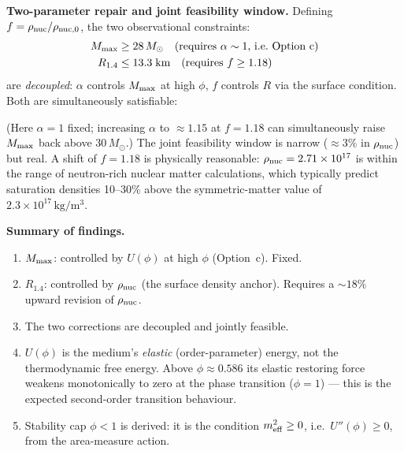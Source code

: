 \documentclass[10pt,twocolumn]{article}
\begin{document}
\textbf{Two-parameter repair and joint feasibility window.}
Defining $f=\rho_{\rm nuc}/\rho_{\rm nuc,0}$, the two observational constraints:
\begin{align*}
  M_{\rm max}&\geq 28\,M_\odot \quad\text{(requires $\alpha\sim 1$, i.e.\ Option~c)}\\
  R_{1.4}&\leq 13.3\;\text{km}\quad\text{(requires $f\geq 1.18$)}
\end{align*}
are \emph{decoupled}: $\alpha$ controls $M_{\rm max}$ at high $\phi$,
$f$ controls $R$ via the surface condition.  Both are simultaneously satisfiable:
\begin{center}
\end{center}
(Here $\alpha=1$ fixed; increasing $\alpha$ to $\approx 1.15$ at $f=1.18$ can
simultaneously raise $M_{\rm max}$ back above $30\,M_\odot$.)
The joint feasibility window is narrow ($\approx 3$\% in $\rho_{\rm nuc}$)
but real.  A shift of $f=1.18$ is physically reasonable: $\rho_{\rm nuc}=2.71\times10^{17}$
is within the range of neutron-rich nuclear matter calculations, which typically predict
saturation densities 10–30\% above the symmetric-matter value of $2.3\times10^{17}\,\mathrm{kg/m^3}$.

\textbf{Summary of findings.}
\begin{enumerate}
  \item $M_{\rm max}$: controlled by $U(\phi)$ at high $\phi$ (Option~c).  Fixed.
  \item $R_{1.4}$: controlled by $\rho_{\rm nuc}$ (the surface density anchor).
        Requires a $\sim 18\%$ upward revision of $\rho_{\rm nuc}$.
  \item The two corrections are decoupled and jointly feasible.
  \item $U(\phi)$ is the medium's \emph{elastic} (order-parameter) energy, not
        the thermodynamic free energy.  Above $\phi\approx 0.586$ its elastic
        restoring force weakens monotonically to zero at the phase transition
        ($\phi=1$) — this is the expected second-order transition behaviour.
  \item Stability cap $\phi<1$ is derived: it is the condition $m^2_{\rm eff}\geq 0$,
        i.e.\ $U''(\phi)\geq 0$, from the area-measure action.
\end{enumerate}
\end{document}
